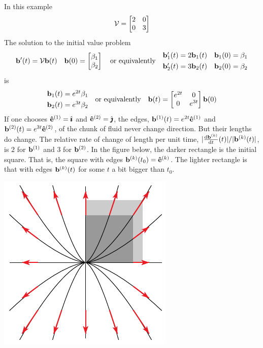 \begin{eg}[$\vv(x,y)= 2x\hi+3y\hj$]\label{eg:flowExpand}
In this example
\begin{equation*}
\mathcal{V}=\left[\begin{matrix}2&0\\ 0&3\end{matrix}\right]
\end{equation*}
The solution to the initial value problem
\begin{equation*}
\mathbf{b}'(t)=\mathcal{V}\mathbf{b}(t)\quad 
      \mathbf{b}(0)=\left[\begin{matrix}\beta_1\cr\beta_2\end{matrix}\right]
\quad\text{or equivalently}\quad
\begin{matrix}\mathbf{b}_1'(t)=2\mathbf{b}_1(t) & \mathbf{b}_1(0)=\beta_1\\[0.05in]
        \mathbf{b}_2'(t)=3\mathbf{b}_2(t) & \mathbf{b}_2(0)=\beta_2\end{matrix}
\end{equation*}
is
\begin{equation*}
\begin{matrix}\mathbf{b}_1(t)=e^{2t}\beta_1\\[0.05in]
        \mathbf{b}_2(t)=e^{3t}\beta_2\end{matrix}
\quad\text{or equivalently}\quad
\mathbf{b}(t)=\left[\begin{matrix}e^{2t}&0\\ 0&e^{3t}\end{matrix}\right]\mathbf{b}(0)
\end{equation*}
If one chooses $\mathbf{\hat e}^{(1)}=\hat{\pmb{\imath}}$ and $\mathbf{\hat e}^{(2)}=\hat{\pmb{\jmath}}$, the edges, 
$\mathbf{b}^{(1)}(t)=e^{2t}\mathbf{\hat e}^{(1)}$ and  $\mathbf{b}^{(2)}(t)=e^{3t}\mathbf{\hat e}^{(2)}$, of the chunk of
fluid never change direction. But their lengths do change. The relative rate
of change of length per unit time, $|\diff{\vb^{(k)}}{t}(t)|/|\vb^{(k)}(t)|$, 
is $2$ for $\mathbf{b}^{(1)}$ and 3 for $\mathbf{b}^{(2)}$. In the figure below, the darker
rectangle is the initial square. That is, the square with edges $\mathbf{b}^{(k)}(t_0)=\mathbf{\hat e}^{(k)}$.
The lighter rectangle is that with edges $\mathbf{b}^{(k)}(t)$ for some $t$ a bit
bigger than $t_0$.

\begin{nfig}
\begin{center}
    \includegraphics{square1.pdf}
\end{center}
\end{nfig}

\end{eg}

